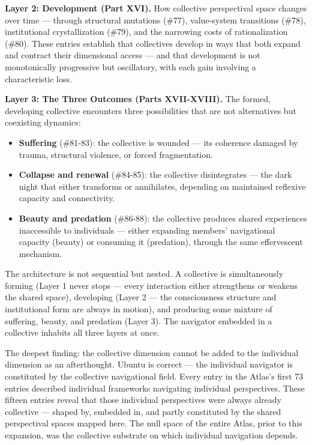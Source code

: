\textbf{Layer 2: Development (Part XVI).} How collective perspectival space changes over time — through structural mutations (\#77), value-system transitions (\#78), institutional crystallization (\#79), and the narrowing costs of rationalization (\#80). These entries establish that collectives develop in ways that both expand and contract their dimensional access — and that development is not monotonically progressive but oscillatory, with each gain involving a characteristic loss.


\textbf{Layer 3: The Three Outcomes (Parts XVII-XVIII).} The formed, developing collective encounters three possibilities that are not alternatives but coexisting dynamics:

\begin{itemize}[nosep,leftmargin=*]
  \item \textbf{Suffering} (\#81-83): the collective is wounded — its coherence damaged by trauma, structural violence, or forced fragmentation.
  \item \textbf{Collapse and renewal} (\#84-85): the collective disintegrates — the dark night that either transforms or annihilates, depending on maintained reflexive capacity and connectivity.
  \item \textbf{Beauty and predation} (\#86-88): the collective produces shared experiences inaccessible to individuals — either expanding members' navigational capacity (beauty) or consuming it (predation), through the same effervescent mechanism.
\end{itemize}


The architecture is not sequential but nested. A collective is simultaneously forming (Layer 1 never stops — every interaction either strengthens or weakens the shared space), developing (Layer 2 — the consciousness structure and institutional form are always in motion), and producing some mixture of suffering, beauty, and predation (Layer 3). The navigator embedded in a collective inhabits all three layers at once.


The deepest finding: the collective dimension cannot be added to the individual dimension as an afterthought. Ubuntu is correct — the individual navigator is constituted by the collective navigational field. Every entry in the Atlas's first 73 entries described individual frameworks navigating individual perspectives. These fifteen entries reveal that those individual perspectives were always already collective — shaped by, embedded in, and partly constituted by the shared perspectival spaces mapped here. The null space of the entire Atlas, prior to this expansion, was the collective substrate on which individual navigation depends.



